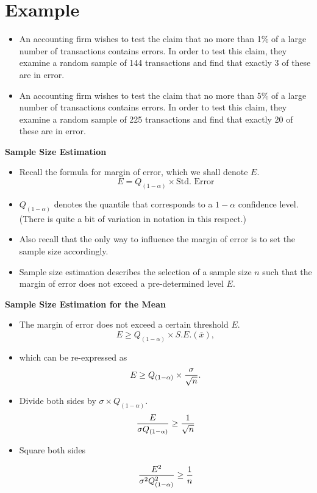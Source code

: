 \documentclass[]{report}
\begin{document}
\section{Example}
\begin{itemize}
\item An accounting firm wishes to test the claim that no more than 1\% of a large
number of transactions contains errors. In order to test this claim, they
examine a random sample of 144 transactions and find that exactly 3 of
these are in error.

\item An accounting firm wishes to test the claim that no more than 5\% of a large
number of transactions contains errors. In order to test this claim, they examine a
random sample of 225 transactions and find that exactly 20 of these are in error.
\end{itemize}


\noindent \textbf{Sample Size Estimation}

\begin{itemize} \item Recall the formula for margin of error, which we shall denote $E$.
\[  E = Q_{(1-\alpha)} \times \mbox{Std. Error}\]

\item $Q_{(1-\alpha)}$ denotes the quantile that corresponds to a $1-\alpha$ confidence level. (There is quite a bit of variation in notation in this respect.)
\item Also recall that the only way to influence the margin of error is to set the sample size accordingly.

\item Sample size estimation describes the selection of a sample size $n$ such that the margin of error does not exceed a pre-determined level $E$.
\end{itemize}



\noindent \textbf{Sample Size Estimation for the Mean}

\begin{itemize}

\item The margin of error does not exceed a certain threshold $E$.
\[ E \geq Q_{(1-\alpha)} \times S.E.(\bar{x}), \]

\item which can be re-expressed as
\[E \geq Q_{(1-\alpha)} \times {\sigma \over \sqrt{n} }.\]

\item Divide both sides by $\sigma \times Q_{(1-\alpha)}$.
\[ \frac{E}{\sigma Q_{(1-\alpha)}} \geq {1 \over \sqrt{n} } \]

\item Square both sides

\[ \frac{E^2}{\sigma^2 Q_{(1-\alpha)}^2} \geq {1 \over n } \]


\end{itemize}
\end{document}
